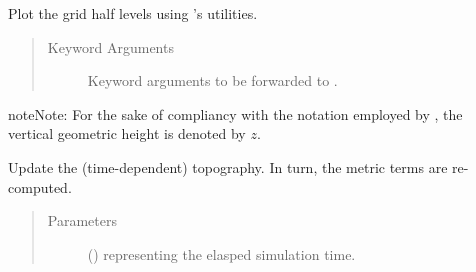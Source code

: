 \documentclass[letterpaper,10pt,english]{sphinxmanual}
\begin{document}
\begin{fulllineitems}
\begin{fulllineitems}
\end{fulllineitems}


\begin{fulllineitems}
\label{\detokenize{api:tasmania.grids.sleve.SLEVE2d.plot}}
Plot the grid half levels using ’s utilities.
\begin{quote}\begin{description}
\item[{Keyword Arguments}] \leavevmode
{} \textendash{} Keyword arguments to be forwarded to .

\end{description}\end{quote}

\begin{sphinxadmonition}{note}{Note:}
For the sake of compliancy with the notation employed by ,
the vertical geometric height is denoted by \(z\).
\end{sphinxadmonition}

\end{fulllineitems}


\begin{fulllineitems}
\label{\detokenize{api:tasmania.grids.sleve.SLEVE2d.update_topography}}
Update the (time-dependent) topography. In turn, the metric terms are re-computed.
\begin{quote}\begin{description}
\item[{Parameters}] \leavevmode
{} () \textendash{}  representing the elasped simulation time.

\end{description}\end{quote}

\end{fulllineitems}


\end{fulllineitems}
\end{document}
